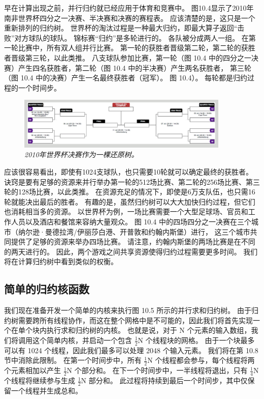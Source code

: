 \begin{remark}[体育和比赛并行约化]
早在计算出现之前，并行归约就已经应用于体育和竞赛中。 图10.4显示了2010年南非世界杯四分之一决赛、半决赛和决赛的赛程表。 
应该清楚的是，这只是一个重新排列的归约树。 世界杯的淘汰过程是一种最大归约，即最大算子返回“击败”对方球队的球队。 
锦标赛“归约”是多轮进行的。 各队被分成两人一组。 在第一轮比赛中，所有双人组并行比赛。 
第一轮的获胜者晋级第二轮，第二轮的获胜者晋级第三轮，以此类推。 
八支球队参加比赛，第一轮（图 10.4 中的四分之一决赛）产生四名获胜者，第二轮（图 10.4 中的半决赛）产生两名获胜者，
第三轮（图 10.4 中的决赛）产生一名最终获胜者（冠军）。 图 10.4）。 每轮都是归约过程的一个时间步。

\begin{figure}[H]
	\centering
	\includegraphics[width=0.9\textwidth]{figs/F10.4.png}
	\caption{\textit{2010年世界杯决赛作为一棵还原树。}}
\end{figure}

应该很容易看出，即使有1024支球队，也只需要10轮就可以确定最终的获胜者。 
诀窍是要有足够的资源来并行举办第一轮的512场比赛、第二轮的256场比赛、第三轮的128场比赛，以此类推。 
在资源充足的情况下，即使是6万支队伍，也只需16轮就能决出最后的胜者。 
有趣的是，虽然归约树可以大大加快归约过程，但它们也消耗相当多的资源。 
以世界杯为例，一场比赛需要一个大型足球场、官员和工作人员以及酒店和餐馆来容纳大量观众。 
图 10.4 中的四场四分之一决赛在三个城市（纳尔逊·曼德拉湾/伊丽莎白港、开普敦和约翰内斯堡）进行，
这三个城市共同提供了足够的资源来举办四场比赛。 请注意，约翰内斯堡的两场比赛是在不同的两天进行的。 
因此，两个游戏之间共享资源使得归约过程需要更多时间。 我们将在计算归约树中看到类似的权衡。
\end{remark}

\subsection{简单的归约核函数}
我们现在准备开发一个简单的内核来执行图 10.5 所示的并行求和归约树。 
由于归约树需要跨所有线程协作，而这在整个网格中是不可能的，因此我们将首先实现一个在单个块内执行求和归约树的内核。 
也就是说，对于 N 个元素的输入数组，我们将调用这个简单内核，并启动一个包含 $\frac{1}{2}$N 个线程块的网格。 
由于一个块最多可以有 1024 个线程，因此我们最多可以处理 2048 个输入元素。 我们将在第 10.8 节中消除此限制。 
在第一个时间步中，所有 $\frac{1}{2}$N 个线程都会参与，每个线程将两个元素相加以产生 $\frac{1}{2}$N 个部分和。 
在下一个时间步中，一半线程将退出，只有 $\frac{1}{4}$N 个线程将继续参与生成 $\frac{1}{2}$N 部分和。 
此过程将持续到最后一个时间步，其中仅保留一个线程并生成总和。

